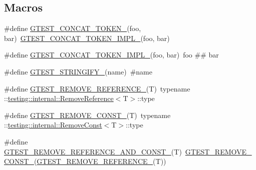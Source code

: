 \subsection*{Macros}
\begin{DoxyCompactItemize}
\item 
\#define \mbox{\hyperlink{googletest-master_2googletest_2include_2gtest_2internal_2gtest-internal_8h_ae3c336cbe1ae2bd1b1d019333e4428a0}{G\+T\+E\+S\+T\+\_\+\+C\+O\+N\+C\+A\+T\+\_\+\+T\+O\+K\+E\+N\+\_\+}}(foo,  bar)~\mbox{\hyperlink{_obj__test_2lib_2googletest-release-1_88_81_2googletest_2include_2gtest_2internal_2gtest-internal_8h_aa39fb5346d3573feebe4257cb3a01fde}{G\+T\+E\+S\+T\+\_\+\+C\+O\+N\+C\+A\+T\+\_\+\+T\+O\+K\+E\+N\+\_\+\+I\+M\+P\+L\+\_\+}}(foo, bar)
\item 
\#define \mbox{\hyperlink{googletest-master_2googletest_2include_2gtest_2internal_2gtest-internal_8h_aa39fb5346d3573feebe4257cb3a01fde}{G\+T\+E\+S\+T\+\_\+\+C\+O\+N\+C\+A\+T\+\_\+\+T\+O\+K\+E\+N\+\_\+\+I\+M\+P\+L\+\_\+}}(foo,  bar)~foo \#\# bar
\item 
\#define \mbox{\hyperlink{googletest-master_2googletest_2include_2gtest_2internal_2gtest-internal_8h_affa935d4361fa573644e9c739dde2b14}{G\+T\+E\+S\+T\+\_\+\+S\+T\+R\+I\+N\+G\+I\+F\+Y\+\_\+}}(name)~\#name
\item 
\#define \mbox{\hyperlink{googletest-master_2googletest_2include_2gtest_2internal_2gtest-internal_8h_a84c72f25a6a6600e3ff8381ca6982ae9}{G\+T\+E\+S\+T\+\_\+\+R\+E\+M\+O\+V\+E\+\_\+\+R\+E\+F\+E\+R\+E\+N\+C\+E\+\_\+}}(T)~typename \+::\mbox{\hyperlink{structtesting_1_1internal_1_1_remove_reference}{testing\+::internal\+::\+Remove\+Reference}}$<$T$>$\+::type
\item 
\#define \mbox{\hyperlink{googletest-master_2googletest_2include_2gtest_2internal_2gtest-internal_8h_a2ffec8c60510eb130af387f5ce9a756a}{G\+T\+E\+S\+T\+\_\+\+R\+E\+M\+O\+V\+E\+\_\+\+C\+O\+N\+S\+T\+\_\+}}(T)~typename \+::\mbox{\hyperlink{structtesting_1_1internal_1_1_remove_const}{testing\+::internal\+::\+Remove\+Const}}$<$T$>$\+::type
\item 
\#define \mbox{\hyperlink{googletest-master_2googletest_2include_2gtest_2internal_2gtest-internal_8h_a874567b176266188fabfffb8393267ce}{G\+T\+E\+S\+T\+\_\+\+R\+E\+M\+O\+V\+E\+\_\+\+R\+E\+F\+E\+R\+E\+N\+C\+E\+\_\+\+A\+N\+D\+\_\+\+C\+O\+N\+S\+T\+\_\+}}(T)~\mbox{\hyperlink{_obj__test_2lib_2googletest-release-1_88_81_2googletest_2include_2gtest_2internal_2gtest-internal_8h_a2ffec8c60510eb130af387f5ce9a756a}{G\+T\+E\+S\+T\+\_\+\+R\+E\+M\+O\+V\+E\+\_\+\+C\+O\+N\+S\+T\+\_\+}}(\mbox{\hyperlink{_obj__test_2lib_2googletest-release-1_88_81_2googletest_2include_2gtest_2internal_2gtest-internal_8h_a84c72f25a6a6600e3ff8381ca6982ae9}{G\+T\+E\+S\+T\+\_\+\+R\+E\+M\+O\+V\+E\+\_\+\+R\+E\+F\+E\+R\+E\+N\+C\+E\+\_\+}}(T))

\end{DoxyCompactItemize}
